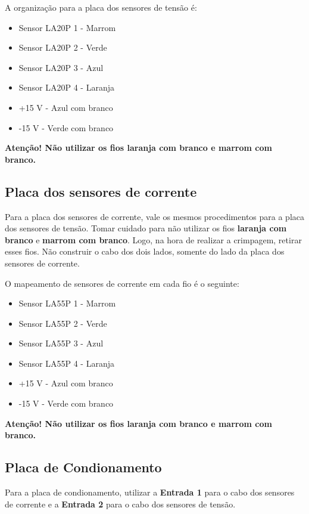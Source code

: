 \begin{apendicesenv}
A organização para a placa dos sensores de tensão é:

\begin{itemize}
    \item Sensor LA20P 1 - Marrom 
    \item Sensor LA20P 2 - Verde 
    \item Sensor LA20P 3 - Azul 
    \item Sensor LA20P 4 - Laranja
    \item +15 V - Azul com branco
    \item -15 V - Verde com branco
\end{itemize}

\textbf{Atenção! Não utilizar os fios laranja com branco e marrom com branco.}

\subsection{Placa dos sensores de corrente}

Para a placa dos sensores de corrente, vale os mesmos procedimentos para a placa dos sensores de tensão. Tomar cuidado para não utilizar os fios \textbf{laranja com branco} e \textbf{marrom com branco}. Logo, na hora de realizar a crimpagem, retirar esses fios. Não construir o cabo dos dois lados, somente do lado da placa dos sensores de corrente. 

O mapeamento de sensores de corrente em cada fio é o seguinte:

\begin{itemize}
    \item Sensor LA55P 1 - Marrom 
    \item Sensor LA55P 2 - Verde 
    \item Sensor LA55P 3 - Azul 
    \item Sensor LA55P 4 - Laranja
    \item +15 V - Azul com branco
    \item -15 V - Verde com branco
\end{itemize}

\textbf{Atenção! Não utilizar os fios laranja com branco e marrom com branco.}

\subsection{Placa de Condionamento}

Para a placa de condionamento, utilizar a \textbf{Entrada 1} para o cabo dos sensores de corrente e a \textbf{Entrada 2} para o cabo dos sensores de tensão. 


\end{apendicesenv}
